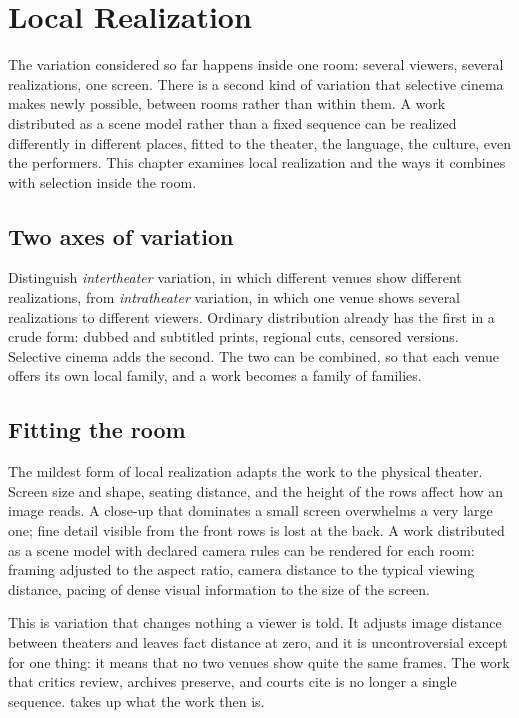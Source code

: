 \chapter{Local Realization}\label{ch:local}

The variation considered so far happens inside one room: several viewers, several realizations, one screen. There is a second kind of variation that selective cinema makes newly possible, between rooms rather than within them. A work distributed as a scene model rather than a fixed sequence can be realized differently in different places, fitted to the theater, the language, the culture, even the performers. This chapter examines local realization and the ways it combines with selection inside the room.

\section{Two axes of variation}

Distinguish \emph{intertheater} variation, in which different venues show different realizations, from \emph{intratheater} variation, in which one venue shows several realizations to different viewers. Ordinary distribution already has the first in a crude form: dubbed and subtitled prints, regional cuts, censored versions. Selective cinema adds the second. The two can be combined, so that each venue offers its own local family, and a work becomes a family of families.

\section{Fitting the room}

The mildest form of local realization adapts the work to the physical theater. Screen size and shape, seating distance, and the height of the rows affect how an image reads. A close-up that dominates a small screen overwhelms a very large one; fine detail visible from the front rows is lost at the back. A work distributed as a scene model with declared camera rules can be rendered for each room: framing adjusted to the aspect ratio, camera distance to the typical viewing distance, pacing of dense visual information to the size of the screen.

This is variation that changes nothing a viewer is told. It adjusts image distance between theaters and leaves fact distance at zero, and it is uncontroversial except for one thing: it means that no two venues show quite the same frames. The work that critics review, archives preserve, and courts cite is no longer a single sequence.  takes up what the work then is.

